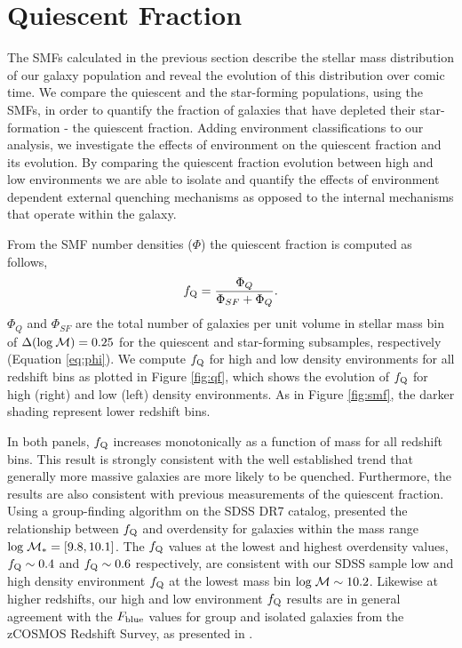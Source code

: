 \documentclass{emulateapj}
\begin{document}
\section{Quiescent Fraction} \label{sec:qf_const}
The SMFs calculated in the previous section describe the stellar mass distribution of our galaxy population and reveal the evolution of this distribution over comic time. We compare the quiescent and the star-forming populations, using the SMFs, in order to quantify the fraction of galaxies that have depleted their star-formation - the quiescent fraction. Adding environment classifications to our analysis, we investigate the effects of environment on the quiescent fraction and its evolution. By comparing the quiescent fraction evolution between high and low environments we are able to isolate and quantify the effects of environment dependent external quenching mechanisms as opposed to the internal mechanisms that operate within the galaxy. 

From the SMF number densities ($\Phi$) the quiescent fraction is computed as follows, 
\begin{equation}
f_{\rm{Q}} = \frac{\Phi_{Q}}{\Phi_{SF}+\Phi_{Q}}.
\end{equation}
$\Phi_{Q}$ and $\Phi_{SF}$ are the total number of galaxies per unit volume in stellar mass bin of $\Delta(\rm{log} \: \mathcal{M}) = 0.25$ for the quiescent and star-forming subsamples, respectively (Equation \ref{eq:phi}). We compute $f_{\rm{Q}}$ for high and low density environments for all redshift bins as plotted in Figure \ref{fig:qf}, which shows the evolution of $f_{\rm{Q}}$ for high (right) and low (left) density environments. As in Figure \ref{fig:smf}, the darker shading represent lower redshift bins. 

In both panels, $f_{\rm{Q}}$ increases monotonically as a function of mass for all redshift bins. This result is strongly consistent with the well established trend that generally more massive galaxies are more likely to be quenched. Furthermore, the results are also consistent with previous measurements of the quiescent fraction. Using a group-finding algorithm on the SDSS DR7 catalog, \cite{Tinker:2011aa} presented the relationship between $f_{\rm{Q}}$ and overdensity for galaxies within the mass range $\rm{log} \; \mathcal{M}_{*} = [9.8, 10.1]$. The \cite{Tinker:2011aa} $f_{\rm{Q}}$ values at the lowest and highest overdensity values, $f_{\rm{Q}} \sim 0.4$ and $f_{\rm{Q}} \sim 0.6$ respectively, are consistent with our SDSS sample low and high density environment $f_{\rm{Q}}$ at the lowest mass bin $\rm{log} \; \mathcal{M} \sim 10.2$. Likewise at higher redshifts, our high and low environment $f_{\rm{Q}}$ results are in general agreement with the $F_{\rm{blue}}$ values for group and isolated galaxies from the zCOSMOS Redshift Survey, as presented in \cite{Iovino:2010aa}. 
\end{document}

